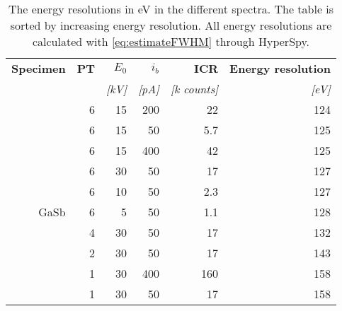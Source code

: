 \begin{table}[phtb]
    \begin{center}
        \caption{
            The energy resolutions in eV in the different spectra.
            The table is sorted by increasing energy resolution.
            All energy resolutions are calculated with \cref{eq:estimateFWHM} through HyperSpy.
        }
        \renewcommand*{\arraystretch}{1.2}
        \label{tab:results:energy_resolutions}
        \begin{tabular}{rrrrrr}
            \hline
            \textbf{Specimen} & \textbf{PT} & \textbf{$E_0$} & \textbf{$i_b$} & \textbf{ICR}      & \textbf{Energy resolution} \\
            \emph{}           & \emph{}     & \emph{[kV]}    & \emph{[pA]}    & \emph{[k counts]} & \emph{[eV]}                \\
            \hline
                              & 6           & 15             & 200            & 22                & 124                        \\
                              & 6           & 15             & 50             & 5.7               & 125                        \\
                              & 6           & 15             & 400            & 42                & 125                        \\
                              & 6           & 30             & 50             & 17                & 127                        \\
                              & 6           & 10             & 50             & 2.3               & 127                        \\
            GaSb              & 6           & 5              & 50             & 1.1               & 128                        \\
                              & 4           & 30             & 50             & 17                & 132                        \\
                              & 2           & 30             & 50             & 17                & 143                        \\
                              & 1           & 30             & 400            & 160               & 158                        \\
                              & 1           & 30             & 50             & 17                & 158                        \\

\end{tabular}
\end{center}
\end{table}
